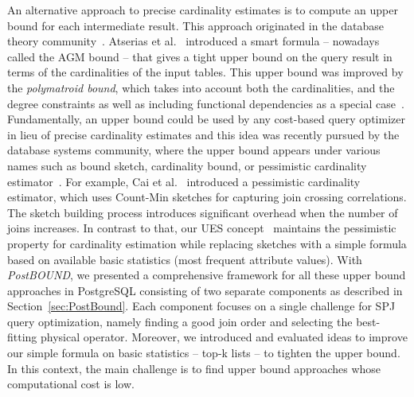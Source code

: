 An alternative approach to precise cardinality estimates is to compute an upper bound for each intermediate result. 
This approach originated in the database theory community~\cite{DBLP:conf/soda/GroheM06}.
Atserias et al.~\cite{DBLP:conf/focs/AtseriasGM08} introduced a smart formula -- nowadays called the AGM bound -- that gives a tight upper bound on the query result in terms of the cardinalities of the input tables. 
This upper bound was improved by the \emph{polymatroid bound}, which takes into account both the cardinalities, and the degree constraints as well as including functional dependencies as a special case~\cite{DBLP:journals/jacm/GottlobLVV12,DBLP:conf/pods/KhamisNS16,DBLP:conf/pods/000118}.
Fundamentally, an upper bound could be used by any cost-based query optimizer in lieu of precise cardinality estimates and this idea was recently pursued by the database systems community, where the upper bound appears under various names such as bound sketch, cardinality bound, or pessimistic cardinality estimator~\cite{DBLP:conf/sigmod/CaiBS19,DBLP:journals/corr/abs-2201-04166,hertzschuch-21-ues}. 
For example, Cai et al.~\cite{DBLP:conf/sigmod/CaiBS19} introduced a pessimistic cardinality estimator, which uses Count-Min sketches for capturing join crossing correlations. 
The sketch building process introduces significant overhead when the number of joins increases.
In contrast to that, our UES concept~\cite{hertzschuch-21-ues} maintains the pessimistic property for cardinality estimation while replacing sketches with a simple formula based on available basic statistics (most frequent attribute values). 
With \emph{PostBOUND}, we presented a comprehensive framework for all these upper bound approaches in PostgreSQL consisting of two separate components as described in Section~\ref{sec:PostBound}.
Each component focuses on a single challenge for SPJ query optimization, namely finding a good join order and selecting the best-fitting physical operator.
Moreover, we introduced and evaluated ideas to improve our simple formula on basic statistics -- top-k lists -- to tighten the upper bound.
In this context, the main challenge is to find upper bound approaches whose computational cost is low. 